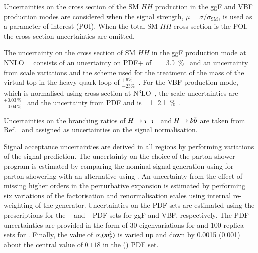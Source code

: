 Uncertainties on the cross section of the SM $HH$ production in the ggF and VBF
production modes are considered when the signal strength,
$\mu = \sigma / \sigma_{\text{SM}}$, is used as a parameter of interest
(POI). When the total SM $HH$ cross section is the POI, the cross section
uncertainties are omitted.

The uncertainty on the cross section of SM $HH$ in the ggF production mode at
NNLO~\FTapprox~\cite{Grazzini:2018bsd} consists of an uncertainty on PDF+\alphas
of \SI{\pm 3.0}{\percent}~\cite{LHCHWGHH} and an uncertainty from scale
variations and the scheme used for the treatment of the mass of the virtual top
in the heavy-quark loop of $^{+6\%}_{-23\%}$~\cite{Baglio:2020wgt}. For the VBF
production mode, which is normalised using cross section at
N$^3$LO~\cite{Dreyer:2018qbw}, the scale uncertainties
are~$^{+0.03\,\%}_{-0.04\,\%}$~\cite{LHCHWGHH} and the uncertainty from PDF and
\alphas is~\SI{\pm 2.1}{\percent}~\cite{LHCHWGHH}.

Uncertainties on the branching ratios of $H \to \tau^{+} \tau^{-}$ and $H \to b\bar{b}$ are
taken from Ref.~\cite{deFlorian:2016spz} and assigned as uncertainties on the
signal normalisation.

Signal acceptance uncertainties are derived in all regions by performing
variations of the signal prediction.
The uncertainty on the choice of the parton shower program is estimated by
comparing the nominal signal generation using \PYTHIA[8.244] for parton
showering with an alternative using \HERWIG[7.1.6]. An uncertainty from the
effect of missing higher orders in the perturbative expansion is estimated by
performing six variations of the factorisation and renormalisation scales using
internal re-weighting of the generator. Uncertainties on the PDF sets are
estimated using the prescriptions for the
\PDFforLHC[15nlo]~\cite{Butterworth:2015oua} and
\NNPDF[3.0nlo]~\cite{Ball:2014uwa} PDF sets for ggF and VBF, respectively. The
PDF uncertainties are provided in the form of 30 eigenvariations for
\PDFforLHC[15nlo] and 100 replica sets for \NNPDF[3.0nlo]. Finally, the value of
$\alpha_{\text{s}}(m_{Z}^2)$ is varied up and down by 0.0015 (0.001) about the central value
of $0.118$ in the \PDFforLHC[15nlo] (\NNPDF[3.0nlo]) PDF set.


